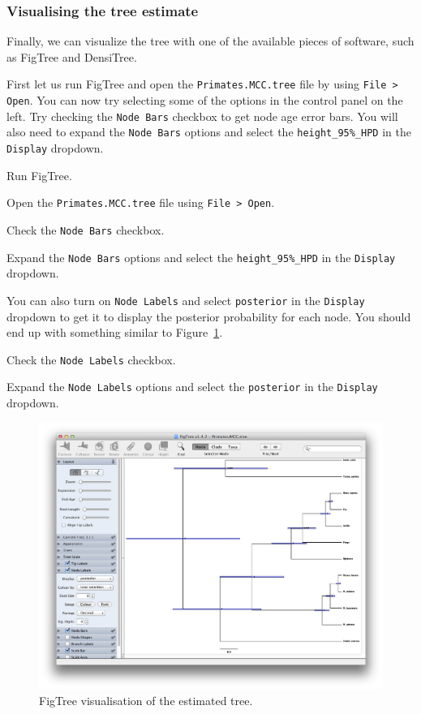 \documentclass[11pt]{article}
\begin{document}
\subsubsection{Visualising the tree estimate}

Finally, we can visualize the tree with one of the available pieces of software, such as FigTree and DensiTree.

First let us run FigTree and open the \texttt{Primates.MCC.tree} file by using \texttt{File > Open}. You can now try selecting some of the options in the control panel on the left. Try checking the \texttt{Node Bars} checkbox to get node age error bars. You will also need to expand the \texttt{Node Bars} options and select the \texttt{height\_95\%\_HPD} in the \texttt{Display} dropdown.

\begin{framed}
Run FigTree.

Open the \texttt{Primates.MCC.tree} file using \texttt{File > Open}.

Check the \texttt{Node Bars} checkbox.

Expand the \texttt{Node Bars} options and select the \texttt{height\_95\%\_HPD} in the \texttt{Display} dropdown.
\end{framed}

You can also turn on \texttt{Node Labels} and select \texttt{posterior} in the \texttt{Display} dropdown to get it to display the posterior probability for each node. You should end up with something similar to Figure~\ref{fig:figtree}.

\begin{framed}
Check the \texttt{Node Labels} checkbox.

Expand the \texttt{Node Labels} options and select the \texttt{posterior} in the \texttt{Display} dropdown.
\end{framed}

\begin{figure}[H]
\centering
\includegraphics[width=5in]{figures/figtree.png}
\caption{\small FigTree visualisation of the estimated tree.}
\label{fig:figtree}
\end{figure}
\end{document}
